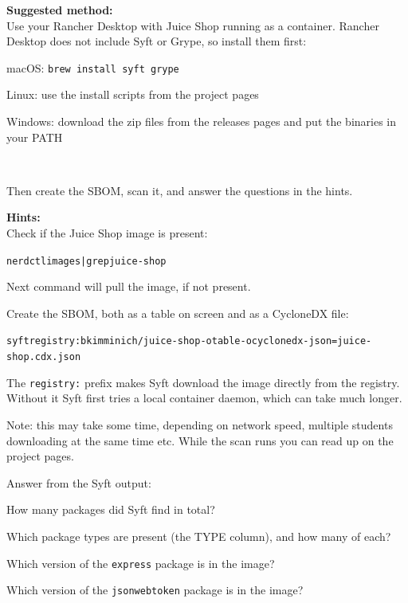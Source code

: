 \documentclass[a4paper,11pt,notitlepage]{report}
\begin{document}
{\bf Suggested method:}\\
Use your Rancher Desktop with Juice Shop running as a container. Rancher Desktop does not include Syft or Grype, so install them first:
\begin{list2}
  \item macOS: \verb+brew install syft grype+
  \item Linux: use the install scripts from the project pages
  \item Windows: download the zip files from the releases pages and put the binaries in your PATH
\end{list2}

\\

Then create the SBOM, scan it, and answer the questions in the hints.


{\bf Hints:}\\
Check if the Juice Shop image is present:
\begin{alltt}
nerdctl images | grep juice-shop
\end{alltt}

Next command will pull the image, if not present.

Create the SBOM, both as a table on screen and as a CycloneDX file:
\begin{alltt}
syft registry:bkimminich/juice-shop -o table -o cyclonedx-json=juice-shop.cdx.json
\end{alltt}

The \verb+registry:+ prefix makes Syft download the image directly from the registry. Without it Syft first tries a local container daemon, which can take much longer.

Note: this may take some time, depending on network speed, multiple students downloading at the same time etc. While the scan runs you can read up on the project pages.

Answer from the Syft output:
\begin{list2}
  \item How many packages did Syft find in total?
  \item Which package types are present (the TYPE column), and how many of each?
  \item Which version of the \verb+express+ package is in the image?
  \item Which version of the \verb+jsonwebtoken+ package is in the image?
\end{list2}
\end{document}
